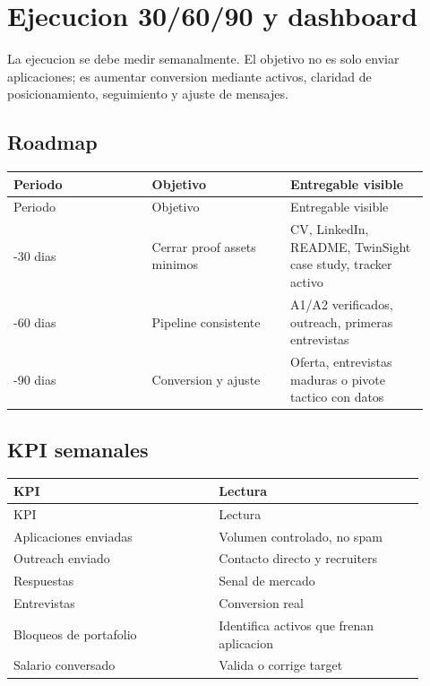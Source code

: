 \chapter{Ejecucion 30/60/90 y dashboard}


La ejecucion se debe medir semanalmente. El objetivo no es solo enviar aplicaciones; es aumentar conversion mediante activos, claridad de posicionamiento, seguimiento y ajuste de mensajes.


\section{Roadmap}


\begin{center}
\scriptsize
\begin{longtable}{>{\raggedright\arraybackslash}p{0.305\linewidth} >{\raggedright\arraybackslash}p{0.305\linewidth} >{\raggedright\arraybackslash}p{0.305\linewidth}}
\toprule
Periodo & Objetivo & Entregable visible \\
\midrule
\endfirsthead
\toprule
Periodo & Objetivo & Entregable visible \\
\midrule
\endhead
0-30 dias & Cerrar proof assets minimos & CV, LinkedIn, README, TwinSight case study, tracker activo \\
31-60 dias & Pipeline consistente & A1/A2 verificados, outreach, primeras entrevistas \\
61-90 dias & Conversion y ajuste & Oferta, entrevistas maduras o pivote tactico con datos \\
\bottomrule
\end{longtable}
\end{center}


\section{KPI semanales}


\begin{center}
\scriptsize
\begin{longtable}{>{\raggedright\arraybackslash}p{0.455\linewidth} >{\raggedright\arraybackslash}p{0.455\linewidth}}
\toprule
KPI & Lectura \\
\midrule
\endfirsthead
\toprule
KPI & Lectura \\
\midrule
\endhead
Aplicaciones enviadas & Volumen controlado, no spam \\
Outreach enviado & Contacto directo y recruiters \\
Respuestas & Senal de mercado \\
Entrevistas & Conversion real \\
Bloqueos de portafolio & Identifica activos que frenan aplicacion \\
Salario conversado & Valida o corrige target \\
\bottomrule
\end{longtable}
\end{center}


